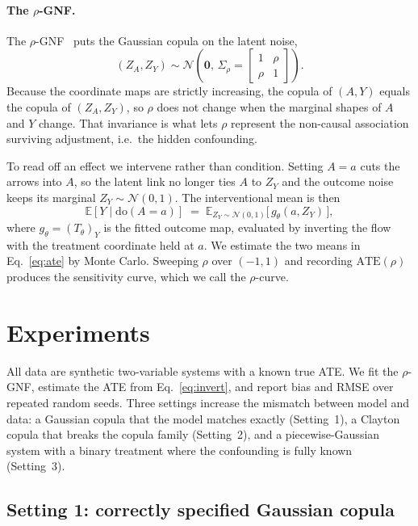 \documentclass[11pt]{article}
\newcommand{\rgnf}{$\rho$-GNF}
\newcommand{\doop}{\mathrm{do}}
\newcommand{\E}{\mathbb{E}}
\newcommand{\N}{\mathcal{N}}
\begin{document}
\paragraph{The $\rho$-GNF.} The \rgnf{}~\cite{balgi2024rho} puts the Gaussian
copula on the latent noise,
\begin{equation}
  (Z_A, Z_Y) \sim \N\!\left(\mathbf{0},\,
  \Sigma_\rho = \begin{bmatrix} 1 & \rho \\ \rho & 1 \end{bmatrix}\right).
  \label{eq:copula}
\end{equation}
Because the coordinate maps are strictly increasing, the copula of $(A,Y)$ equals
the copula of $(Z_A,Z_Y)$, so $\rho$ does not change when the marginal shapes of
$A$ and $Y$ change. That invariance is what lets $\rho$ represent the non-causal
association surviving adjustment, i.e.\ the hidden confounding.

To read off an effect we intervene rather than condition. Setting $A=a$ cuts the
arrows into $A$, so the latent link no longer ties $A$ to $Z_Y$ and the outcome
noise keeps its marginal $Z_Y\sim\N(0,1)$. The interventional mean is then
\begin{equation}
  \E[Y\mid \doop(A=a)] \;=\; \E_{Z_Y\sim\N(0,1)}\big[\,g_\theta(a, Z_Y)\,\big],
  \label{eq:invert}
\end{equation}
where $g_\theta=(T_\theta)_Y$ is the fitted outcome map, evaluated by inverting the
flow with the treatment coordinate held at $a$. We estimate the two means in
Eq.~\eqref{eq:ate} by Monte Carlo. Sweeping $\rho$ over $(-1,1)$ and recording
$\mathrm{ATE}(\rho)$ produces the sensitivity curve, which we call the
$\rho$-curve.

\section{Experiments}

All data are synthetic two-variable systems with a known true ATE. We fit the
\rgnf{}, estimate the ATE from Eq.~\eqref{eq:invert}, and report bias and RMSE over
repeated random seeds. Three settings increase the mismatch between model and data:
a Gaussian copula that the model matches exactly (Setting~1), a Clayton copula that
breaks the copula family (Setting~2), and a piecewise-Gaussian system with a binary
treatment where the confounding is fully known (Setting~3).

\subsection{Setting 1: correctly specified Gaussian copula}
\end{document}
